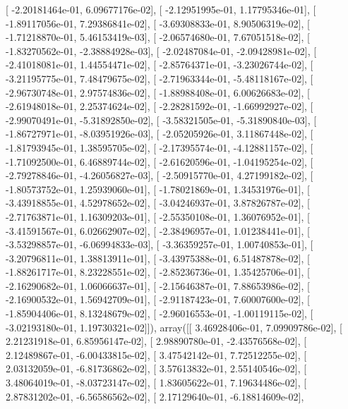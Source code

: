 \documentclass{article}
\begin{document}
       [ -2.20181464e-01,   6.09677176e-02],
       [ -2.12951995e-01,   1.17795346e-01],
       [ -1.89117056e-01,   7.29386841e-02],
       [ -3.69308833e-01,   8.90506319e-02],
       [ -1.71218870e-01,   5.46153419e-03],
       [ -2.06574680e-01,   7.67051518e-02],
       [ -1.83270562e-01,  -2.38884928e-03],
       [ -2.02487084e-01,  -2.09428981e-02],
       [ -2.41018081e-01,   1.44554471e-02],
       [ -2.85764371e-01,  -3.23026744e-02],
       [ -3.21195775e-01,   7.48479675e-02],
       [ -2.71963344e-01,  -5.48118167e-02],
       [ -2.96730748e-01,   2.97574836e-02],
       [ -1.88988408e-01,   6.00626683e-02],
       [ -2.61948018e-01,   2.25374624e-02],
       [ -2.28281592e-01,  -1.66992927e-02],
       [ -2.99070491e-01,  -5.31892850e-02],
       [ -3.58321505e-01,  -5.31890840e-03],
       [ -1.86727971e-01,  -8.03951926e-03],
       [ -2.05205926e-01,   3.11867448e-02],
       [ -1.81793945e-01,   1.38595705e-02],
       [ -2.17395574e-01,  -4.12881157e-02],
       [ -1.71092500e-01,   6.46889744e-02],
       [ -2.61620596e-01,  -1.04195254e-02],
       [ -2.79278846e-01,  -4.26056827e-03],
       [ -2.50915770e-01,   4.27199182e-02],
       [ -1.80573752e-01,   1.25939060e-01],
       [ -1.78021869e-01,   1.34531976e-01],
       [ -3.43918855e-01,   4.52978652e-02],
       [ -3.04246937e-01,   3.87826787e-02],
       [ -2.71763871e-01,   1.16309203e-01],
       [ -2.55350108e-01,   1.36076952e-01],
       [ -3.41591567e-01,   6.02662907e-02],
       [ -2.38496957e-01,   1.01238441e-01],
       [ -3.53298857e-01,  -6.06994833e-03],
       [ -3.36359257e-01,   1.00740853e-01],
       [ -3.20796811e-01,   1.38813911e-01],
       [ -3.43975388e-01,   6.51487878e-02],
       [ -1.88261717e-01,   8.23228551e-02],
       [ -2.85236736e-01,   1.35425706e-01],
       [ -2.16290682e-01,   1.06066637e-01],
       [ -2.15646387e-01,   7.88653986e-02],
       [ -2.16900532e-01,   1.56942709e-01],
       [ -2.91187423e-01,   7.60007600e-02],
       [ -1.85904406e-01,   8.13248679e-02],
       [ -2.96016553e-01,  -1.00119115e-02],
       [ -3.02193180e-01,   1.19730321e-02]]), array([[  3.46928406e-01,   7.09909786e-02],
       [  2.21231918e-01,   6.85956147e-02],
       [  2.98890780e-01,  -2.43576568e-02],
       [  2.12489867e-01,  -6.00433815e-02],
       [  3.47542142e-01,   7.72512255e-02],
       [  2.03132059e-01,  -6.81736862e-02],
       [  3.57613832e-01,   2.55140546e-02],
       [  3.48064019e-01,  -8.03723147e-02],
       [  1.83605622e-01,   7.19634486e-02],
       [  2.87831202e-01,  -6.56586562e-02],
       [  2.17129640e-01,  -6.18814609e-02],
\end{document}
